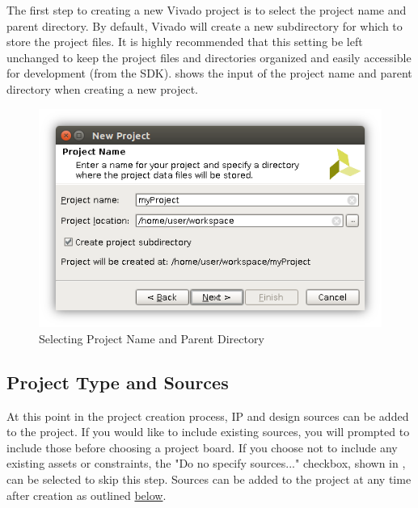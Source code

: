 \noindent
The first step to creating a new Vivado project is to select the project name and parent directory. By default, Vivado will create a new subdirectory for which to store the project files. It is highly recommended that this setting be left unchanged to keep the project files and directories organized and easily accessible for development (\ie from the SDK).  shows the input of the project name and parent directory when creating a new project. \\

\begin{figure}
	\centering
	\includegraphics{images/New_Project}
	\caption{Selecting Project Name and Parent Directory}
	\label{fig:vivadonewprojectname}
\end{figure}

\subsection{Project Type and Sources}
At this point in the project creation process, IP and design sources can be added to the project. If you would like to include existing sources, you will prompted to include those before choosing a project board. If you choose not to include any existing assets or constraints, the "Do no specify sources..." checkbox, shown in , can be selected to skip this step. Sources can be added to the project at any time after creation as outlined \hyperref[sub:addsources]{below}.\\

